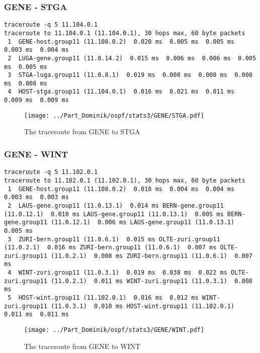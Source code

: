 \subsubsection{GENE - STGA}
\begin{lstlisting}
traceroute -q 5 11.104.0.1
traceroute to 11.104.0.1 (11.104.0.1), 30 hops max, 60 byte packets
 1  GENE-host.group11 (11.108.0.2)  0.020 ms  0.005 ms  0.005 ms  0.003 ms  0.004 ms
 2  LUGA-gene.group11 (11.0.14.2)  0.015 ms  0.006 ms  0.006 ms  0.005 ms  0.005 ms
 3  STGA-luga.group11 (11.0.8.1)  0.019 ms  0.008 ms  0.008 ms  0.008 ms  0.008 ms
 4  HOST-stga.group11 (11.104.0.1)  0.016 ms  0.021 ms  0.011 ms  0.009 ms  0.009 ms
\end{lstlisting}
\begin{figure}[H]
\centering
\texttt{[image: ../Part\_Dominik/ospf/stats3/GENE/STGA.pdf]}
\caption{The traceroute from GENE to STGA}
\end{figure}
\clearpage
\subsubsection{GENE - WINT}
\begin{lstlisting}
traceroute -q 5 11.102.0.1
traceroute to 11.102.0.1 (11.102.0.1), 30 hops max, 60 byte packets
 1  GENE-host.group11 (11.108.0.2)  0.018 ms  0.004 ms  0.004 ms  0.003 ms  0.003 ms
 2  LAUS-gene.group11 (11.0.13.1)  0.014 ms BERN-gene.group11 (11.0.12.1)  0.010 ms LAUS-gene.group11 (11.0.13.1)  0.005 ms BERN-gene.group11 (11.0.12.1)  0.006 ms LAUS-gene.group11 (11.0.13.1)  0.005 ms
 3  ZURI-bern.group11 (11.0.6.1)  0.015 ms OLTE-zuri.group11 (11.0.2.1)  0.016 ms ZURI-bern.group11 (11.0.6.1)  0.007 ms OLTE-zuri.group11 (11.0.2.1)  0.008 ms ZURI-bern.group11 (11.0.6.1)  0.007 ms
 4  WINT-zuri.group11 (11.0.3.1)  0.019 ms  0.038 ms  0.022 ms OLTE-zuri.group11 (11.0.2.1)  0.011 ms WINT-zuri.group11 (11.0.3.1)  0.008 ms
 5  HOST-wint.group11 (11.102.0.1)  0.016 ms  0.012 ms WINT-zuri.group11 (11.0.3.1)  0.010 ms HOST-wint.group11 (11.102.0.1)  0.011 ms  0.011 ms
\end{lstlisting}
\begin{figure}[H]
\centering
\texttt{[image: ../Part\_Dominik/ospf/stats3/GENE/WINT.pdf]}
\caption{The traceroute from GENE to WINT}
\end{figure}
\clearpage
